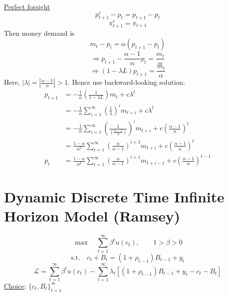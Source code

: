 \documentclass[twoside]{article}
\begin{document}
\begin{example}
\underline{Perfect forsight}
    \begin{equation}
        p^{e}_{t+1} - p_{t} = p_{t+1} - p_{t}
    \end{equation}
    \begin{equation}
        \pi^{e}_{t+1} = \pi_{t+1}
    \end{equation}
    Then money demand is 
    \begin{equation}
        m_{t} - p_{t} = \alpha (p_{t+1} - p_{t})
    \end{equation}
    \begin{equation}
        \Longrightarrow p_{t+1} - \frac{\alpha-1}{\alpha}p_{t} = \frac{m_{t}}{\alpha}
    \end{equation}
    \begin{equation}
        \Longrightarrow (1 - \lambda L) p_{t+1} = \frac{m_{t}}{\alpha}
    \end{equation}
    Here, $|\lambda| = | \frac{\alpha-1}{\alpha}| > 1$. Hence use backward-looking solution:
    \begin{equation}
        \begin{aligned}
            p_{t+1} 
            &= - \frac{1}{\alpha} \left ( \frac{1}{1 - \lambda L} \right ) m_{t} + c \lambda^{t}\\
            &= - \frac{1}{\alpha} \sum_{i=1}^{\infty} \left ( \frac{1}{\lambda} \right )^i m_{t+i} + c \lambda^{t}\\
            &= - \frac{1}{\alpha} \sum_{i=1}^{\infty} \left ( \frac{1}{(\frac{\alpha-1}{\alpha})} \right )^i m_{t+i} + c (\frac{\alpha-1}{\alpha})^{t}\\
            &= \frac{1- \alpha}{\alpha^2} \sum_{i=1}^{\infty} \left ( \frac{\alpha}{\alpha-1} \right )^{i+1} m_{t+i} + c (\frac{\alpha-1}{\alpha})^{t}\\
            p_{t} &= \frac{1- \alpha}{\alpha^2} \sum_{i=1}^{\infty} \left ( \frac{\alpha}{\alpha-1} \right )^{i+1} m_{t+i-1} + c (\frac{\alpha-1}{\alpha})^{t-1}
        \end{aligned}
    \end{equation}
\end{example}

\section{Dynamic Discrete Time Infinite Horizon Model (Ramsey)}
\begin{equation}
    \max \quad \sum_{t=1}^{\infty} \beta^{t} u(c_{t}), \qquad 1 > \beta > 0
\end{equation}
\begin{equation}
    \text{s.t.} \quad c_t + B_{t} = (1+ \rho_{t-1}) B_{t-1} + y_{t}
\end{equation}
\begin{equation}
    \mathcal{L} = \sum_{t=1}^{\infty} \beta^{t} u(c_{t}) -  \sum_{t=1}^{\infty} \lambda_{t} [(1+ \rho_{t-1}) B_{t-1} + y_{t} - c_t - B_{t}]
\end{equation}
\underline{Choice}: $\{c_{t}, B_{t}\}_{t=1}^{\infty}$
\end{document}
